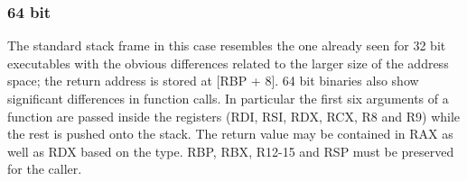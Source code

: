 \subsubsection{64 bit}
The standard stack frame in this case resembles the one already seen for 32 bit executables with the obvious differences
related to the larger size of the address space; the return address is stored at [{\ttfamily RBP + 8}]. 64 bit binaries
also show significant differences in function calls.
In particular the first six arguments of a function are passed inside the registers ({\ttfamily RDI}, {\ttfamily RSI},
{\ttfamily RDX}, {\ttfamily RCX}, {\ttfamily R8} and {\ttfamily R9}) while the rest is pushed onto the stack. The return
value may be contained in {\ttfamily RAX} as well as {\ttfamily RDX} based on the type. {\ttfamily RBP}, {\ttfamily
RBX}, {\ttfamily R12-15} and {\ttfamily RSP} must be preserved for the caller. 
